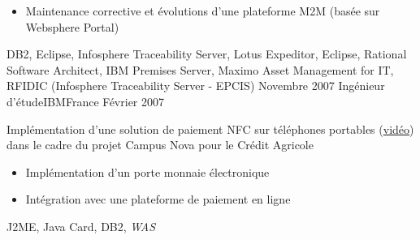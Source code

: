 \begin{experiences}
{\begin{itemize}
                        \item Maintenance corrective et évolutions d'une plateforme M2M (basée sur Websphere Portal)    
                      \end{itemize}
                    }
                    {
                      DB2, Eclipse, Infosphere Traceability Server, Lotus Expeditor, Eclipse, 
                      Rational Software Architect, IBM Premises Server, Maximo Asset Management for IT, RFIDIC (Infosphere Traceability Server - EPCIS)
                    }
  \emptySeparator
  \experience
  {Novembre 2007}  {Ingénieur d'étude}{IBM}{France}
  {Février 2007}   {
                      Implémentation d'une solution de paiement NFC sur téléphones portables (\href{http://www.nouvo.ch/s-007}{vidéo}) 
                      dans le cadre du projet Campus Nova pour le Crédit Agricole  
                      \begin{itemize}
                        \item Implémentation d'un porte monnaie électronique                                            
                        \item Intégration avec une plateforme de paiement en ligne  
                      \end{itemize}
                  }
                  {J2ME, Java Card, DB2, \emph{WAS}}  
\end{experiences}
